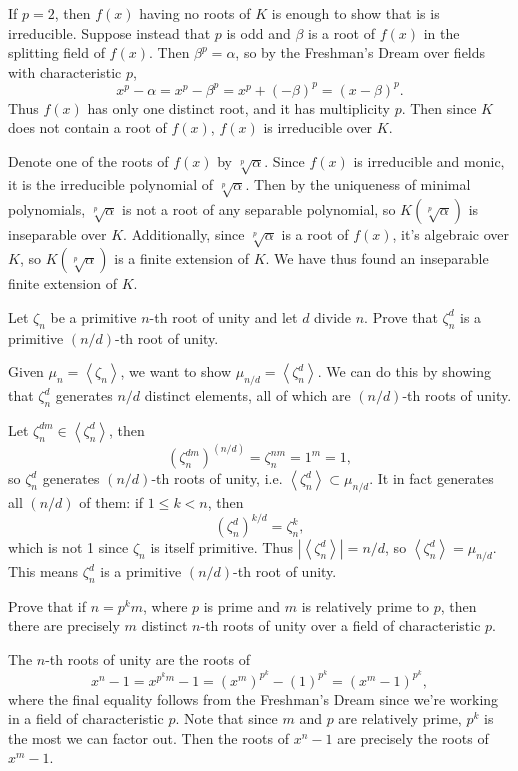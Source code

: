 \documentclass[10pt]{report}
\begin{document}
If $p=2$, then $ f(x)$ having no roots of $K$ is enough to show that is is irreducible. Suppose instead that $p$ is odd and $\beta$ is a root of $f(x)$ in the splitting field of $f(x)$. Then $\beta^p=\alpha$, so by the Freshman's Dream over fields with characteristic $p$,
\[
	x^p-\alpha=x^p - \beta^p = x^p + (-\beta)^p = (x-\beta)^p.
\] Thus $f(x)$ has only one distinct root, and it has multiplicity $p$. Then since $K$ does not contain a root of $f(x)$, $f(x)$ is irreducible over $K$.

Denote one of the roots of $f(x)$ by $\sqrt[p]{\alpha} $. Since $f(x)$ is irreducible and monic, it is the irreducible polynomial of $\sqrt[p]{\alpha}$. Then by the uniqueness of minimal polynomials, $\sqrt[p]{\alpha}$ is not a root of any separable polynomial, so $K(\sqrt[p]{\alpha})$ is inseparable over $K$. Additionally, since $\sqrt[p]{\alpha}$ is a root of $f(x)$, it's algebraic over $K$, so $K(\sqrt[p]{\alpha})$ is a finite extension of $K$. We have thus found an inseparable finite extension of $K$.


\begin{exer}[DF 13.6: 2]
	Let $\zeta_{n}$ be a primitive $n$-th root of unity and let $d$ divide $n$. Prove that $\zeta_{n}^d$ is a primitive $(n/d)$-th root of unity.
\end{exer}
Given $\mu_{n}=\left\langle \zeta_{n} \right\rangle$, we want to show $\mu_{n/d}=\left\langle \zeta_{n}^{d} \right\rangle$. We can do this by showing that $\zeta_{n}^{d}$ generates $n/d$ distinct elements, all of which are $(n/d)$-th roots of unity.

Let $\zeta_{n}^{d m} \in \left\langle \zeta_{n}^{d} \right\rangle$, then
\[
	(\zeta_{n}^{d m})^{(n/d)} = \zeta_{n}^{nm} = 1^m = 1,
\] so $\zeta_{n}^d$ generates $(n/d)$-th roots of unity, i.e. $\left\langle \zeta_{n}^{d} \right\rangle \subset \mu_{n/d}$. It in fact generates all $(n/d)$ of them: if $1 \leq k < n$, then
\[
	(\zeta_{n}^{d})^{k/d} = \zeta^{k}_{n},
\] which is not 1 since $\zeta_{n}$ is itself primitive. Thus $\left| \left\langle \zeta_{n}^{d} \right\rangle \right|=n/d$, so $\left\langle \zeta_{n}^{d} \right\rangle = \mu_{n/d}$. This means $\zeta_{n}^{d}$ is a primitive $(n/d)$-th root of unity.
\newpage

\begin{exer}[DF 13.6: 4]
	Prove that if $n=p^k m$, where $p$ is prime and $m$ is relatively prime to $p$, then there are precisely $m$ distinct $n$-th roots of unity over a field of characteristic $p$.
\end{exer}
The $n$-th roots of unity are the roots of
\[
	x^n-1 = x^{p^km}-1 = (x^{m})^{p^k}-(1)^{p^k} = (x^{m}-1)^{p^k},
\] where the final equality follows from the Freshman's Dream since we're working in a field of characteristic $p$. Note that since $m$ and $p$ are relatively prime, $p^k$ is the most we can factor out. Then the roots of $x^n-1$ are precisely the roots of $x^{m}-1$.
\end{document}
